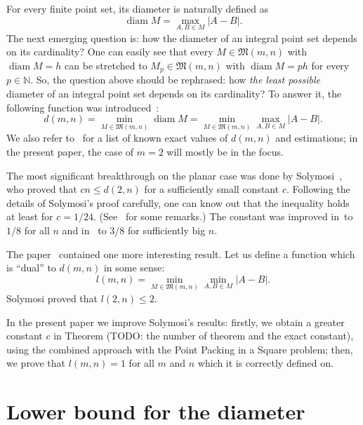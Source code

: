 \documentclass[a4paper,14pt]{article} %
\theoremstyle{plain}
\begin{document}
For every finite point set, its diameter is naturally defined as
\begin{equation}
	\operatorname{diam} M = \max_{A,B\in M} |A-B|
	.
\end{equation}
The next emerging question is: how the diameter of an integral point set depends on its cardinality?
One can easily see that every $M\in\mathfrak{M}(m,n)$ with $\operatorname{diam} M = h$
can be stretched to $M_p\in\mathfrak{M}(m,n)$ with $\operatorname{diam} M = ph$
for every $p\in\mathbb{N}$.
So, the question above should be rephrased:
how \textit{the least possible} diameter of an integral point set depends on its cardinality?
To answer it, the following function was introduced~\cite{kurz2008bounds,kurz2008minimum}:
\begin{equation}
	d(m,n) = \min_{M\in\mathfrak{M}(m,n)} \operatorname{diam} M = \min_{M\in\mathfrak{M}(m,n)} \max_{A,B\in M} |A-B|
	.
\end{equation}
We also refer to~\cite{kurz2008bounds} for a list of known exact values of $d(m,n)$
and estimations; in the present paper, the case of $m=2$ will mostly be in the focus.

The most significant breakthrough on the planar case was done by Solymosi~\cite{solymosi2003note},
who proved that $cn \leq d(2,n)$ for a sufficiently small constant $c$.
Following the details of Solymosi's proof carefully,
one can know out that the inequality holds at least for $c = 1/24$.
(See~\cite[Exercise 2.6]{garibaldi2005erdos} for some remarks.)
The constant was improved in~\cite{our-mz-rus}to $1/8$ for all $n$ and in~\cite{our-vmmsh-2018}
to $3/8$ for sufficiently big $n$.

The paper~\cite{solymosi2003note} contained one more interesting result.
Let us define a function which is ``dual'' to $d(m,n)$ in some sense:
\begin{equation}
	l(m,n) = \min_{M\in\mathfrak{M}(m,n)} \min_{A,B\in M} |A-B|
	.
\end{equation}
Solymosi proved that $l(2,n)\leq 2$.

In the present paper we improve Solymosi's results:
firstly, we obtain a greater constant $c$ in Theorem (TODO: the number of theorem and the exact constant),
using the combined approach with the Point Packing in a Square problem;
then, we prove that $l(m,n)=1$ for all $m$ and $n$ which it is correctly defined on.


\section{Lower bound for the diameter}
\end{document}
